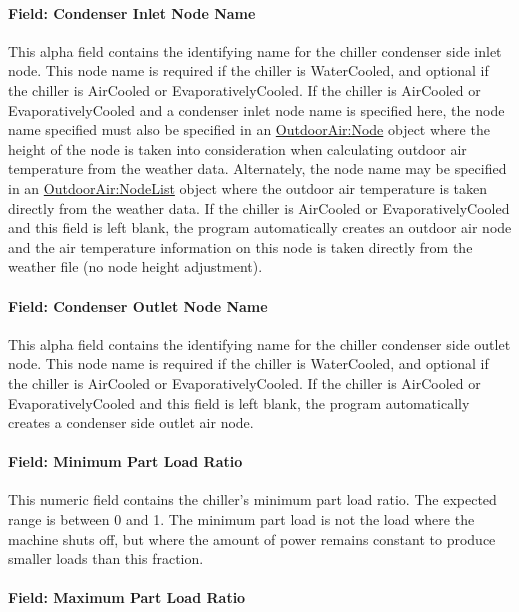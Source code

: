 \paragraph{Field: Condenser Inlet Node Name}\label{field-condenser-inlet-node-name-5}

This alpha field contains the identifying name for the chiller condenser side inlet node. This node name is required if the chiller is WaterCooled, and optional if the chiller is AirCooled or EvaporativelyCooled. If the chiller is AirCooled or EvaporativelyCooled and a condenser inlet node name is specified here, the node name specified must also be specified in an \hyperref[outdoorairnode]{OutdoorAir:Node} object where the height of the node is taken into consideration when calculating outdoor air temperature from the weather data. Alternately, the node name may be specified in an \hyperref[outdoorairnodelist]{OutdoorAir:NodeList} object where the outdoor air temperature is taken directly from the weather data. If the chiller is AirCooled or EvaporativelyCooled and this field is left blank, the program automatically creates an outdoor air node and the air temperature information on this node is taken directly from the weather file (no node height adjustment).

\paragraph{Field: Condenser Outlet Node Name}\label{field-condenser-outlet-node-name-5}

This alpha field contains the identifying name for the chiller condenser side outlet node. This node name is required if the chiller is WaterCooled, and optional if the chiller is AirCooled or EvaporativelyCooled. If the chiller is AirCooled or EvaporativelyCooled and this field is left blank, the program automatically creates a condenser side outlet air node.

\paragraph{Field: Minimum Part Load Ratio}\label{field-minimum-part-load-ratio-5}

This numeric field contains the chiller's minimum part load ratio. The expected range is between 0 and 1. The minimum part load is not the load where the machine shuts off, but where the amount of power remains constant to produce smaller loads than this fraction.

\paragraph{Field: Maximum Part Load Ratio}\label{field-maximum-part-load-ratio-5}

